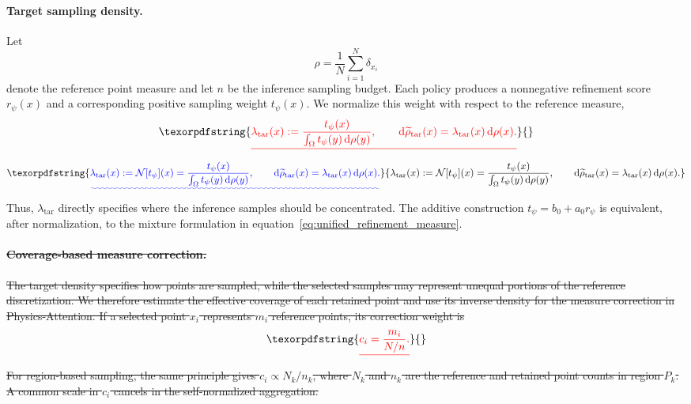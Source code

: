 \documentclass{article}
\def\eqref#1{equation~\ref{#1}}
\providecommand{\DIFaddtex}[1]{{\protect\color{blue}\uwave{#1}}} %
\providecommand{\DIFdeltex}[1]{{\protect\color{red}\sout{#1}}}                      %
\providecommand{\DIFaddbegin}{} %
\providecommand{\DIFaddend}{} %
\providecommand{\DIFdelbegin}{} %
\providecommand{\DIFdelend}{} %
\providecommand{\DIFadd}[1]{\texorpdfstring{\DIFaddtex{#1}}{#1}} %
\providecommand{\DIFdel}[1]{\texorpdfstring{\DIFdeltex{#1}}{}} %
\newcommand{\DIFscaledelfig}{0.5}
\newlength{\DIFdelgraphicswidth} %
\newlength{\DIFdelgraphicsheight} %
\newcommand{\DIFaddincludegraphics}[2][]{{\color{blue}\fbox{\DIFOincludegraphics[#1]{#2}}}} %
\newcommand{\DIFdelincludegraphics}[2][]{%
\sbox{\DIFdelgraphicsbox}{\DIFOincludegraphics[#1]{#2}}%
\settoboxwidth{\DIFdelgraphicswidth}{\DIFdelgraphicsbox} %
\settoboxtotalheight{\DIFdelgraphicsheight}{\DIFdelgraphicsbox} %
\scalebox{\DIFscaledelfig}{%
\parbox[b]{\DIFdelgraphicswidth}{\usebox{\DIFdelgraphicsbox}\\[-\baselineskip] \rule{\DIFdelgraphicswidth}{0em}}\llap{\resizebox{\DIFdelgraphicswidth}{\DIFdelgraphicsheight}{%
\setlength{\unitlength}{\DIFdelgraphicswidth}%
\begin{picture}(1,1)%
\thicklines\linethickness{2pt} %
{\color[rgb]{1,0,0}\put(0,0){\framebox(1,1){}}}%
{\color[rgb]{1,0,0}\put(0,0){\line( 1,1){1}}}%
{\color[rgb]{1,0,0}\put(0,1){\line(1,-1){1}}}%
\end{picture}%
}\hspace*{3pt}}} %
} %
\DeclareRobustCommand{\DIFaddbegin}{\DIFOaddbegin \let\includegraphics\DIFaddincludegraphics} %
\DeclareRobustCommand{\DIFaddend}{\DIFOaddend \let\includegraphics\DIFOincludegraphics} %
\DeclareRobustCommand{\DIFdelbegin}{\DIFOdelbegin \let\includegraphics\DIFdelincludegraphics} %
\DeclareRobustCommand{\DIFdelend}{\DIFOaddend \let\includegraphics\DIFOincludegraphics} %
\renewcommand{\DIFaddincludegraphics}[2][]{%
  \begingroup
  \sbox{\DIFdelgraphicsbox}{\DIFOincludegraphics[#1]{#2}}%
  \setlength{\fboxsep}{0pt}\setlength{\fboxrule}{0.8pt}%
  {\color{blue}\fbox{\resizebox{\dimexpr\wd\DIFdelgraphicsbox-2\fboxrule\relax}{!}{\usebox{\DIFdelgraphicsbox}}}}%
  \endgroup
}
\begin{document}
\paragraph{Target sampling density.}
Let
\[
    \rho=\frac{1}{N}\sum_{i=1}^{N}\delta_{x_i}
\]
denote the reference point measure and let $n$ be the inference sampling
budget. Each policy produces a nonnegative refinement score $r_\psi(x)$ and
a corresponding positive sampling weight $t_\psi(x)$. We normalize this weight
with respect to the reference measure,
\DIFdelbegin \begin{displaymath}
    \DIFdel{\lambda_{\mathrm{tar}}(x)
    :=
    \frac{t_\psi(x)}{\int_\Omega t_\psi(y)\,\mathrm{d}\rho(y)},
    \qquad
    \mathrm{d}\widetilde{\rho}_{\mathrm{tar}}(x)
    =
    \lambda_{\mathrm{tar}}(x)\,\mathrm{d}\rho(x).
    \relax{}
}\end{displaymath}%
\DIFdelend \DIFaddbegin \begin{equation}
    \DIFadd{\lambda_{\mathrm{tar}}(x)
    :=\mathcal{N}[t_\psi](x)
    =\frac{t_\psi(x)}{\int_\Omega t_\psi(y)\,\mathrm{d}\rho(y)},
    \qquad
    \mathrm{d}\widetilde{\rho}_{\mathrm{tar}}(x)
    =
    \lambda_{\mathrm{tar}}(x)\,\mathrm{d}\rho(x).
    \label{eq:app_target_density}
}\end{equation}\DIFaddend 
Thus, $\lambda_{\mathrm{tar}}$ directly specifies where the inference samples
should be concentrated. The additive construction
$t_\psi=b_0+a_0r_\psi$ is equivalent, after normalization, to the mixture
formulation in \eqref{eq:unified_refinement_measure}.

\DIFdelbegin \paragraph{\DIFdel{Coverage-based measure correction.}}
\addtocounter{paragraph}{-1}%
\DIFdel{The target density specifies how points are sampled, while the selected samples
may represent unequal portions of the reference discretization. We therefore
estimate the effective coverage of each retained point and use its inverse
density for the measure correction in Physics-Attention. If a selected point
$x_i$ represents $m_i$ reference points, its correction weight is
}\begin{displaymath}
    \DIFdel{c_i
    =
    \frac{m_i}{N/n}.
    \relax{}
}\end{displaymath}%
\DIFdel{For region-based sampling, the same principle gives
$c_i\propto N_k/n_k$, where $N_k$ and $n_k$ are the reference and retained
point counts in region $P_k$. A common scale in $c_i$ cancels in the
self-normalized aggregation. 
}%
\end{document}
